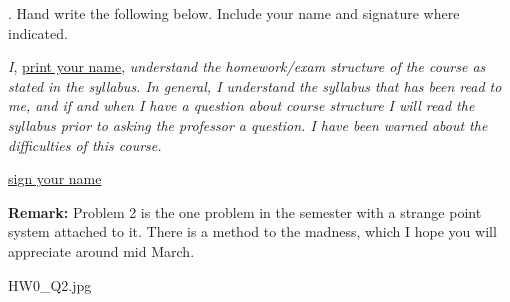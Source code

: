 \documentclass[12pt]{article}
\begin{document}
.  Hand write the following below.  Include your name and signature where indicated.   
\vspace{.15in}

\noindent \textit{I}, \underline{print your name}, \textit{ understand the homework/exam structure of the course as stated in the syllabus.  In general, I understand the syllabus that has been read to me, and if and when I have a question about course structure I will read the syllabus prior to asking the professor a question.  I have been warned about the difficulties of this course.}
\vspace{.15in}

\noindent \underline{sign your name}
\vspace{.15in}

\noindent \textbf{Remark:}  Problem 2 is the one problem in the semester with a strange point system attached to it.  There is a method to the madness, which I hope you will appreciate around mid March.  

HW0\_Q2.jpg
\end{document}

